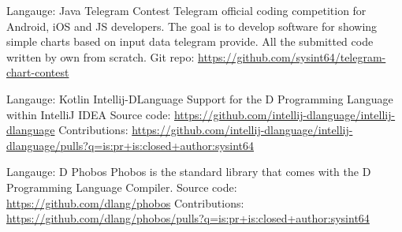 
\cventry
{Langauge: Java}
{Telegram Contest}
{}
{}
{
Telegram official coding competition for Android, iOS and JS developers. \linebreak
The goal is to develop software for showing simple charts based on input data telegram provide.\linebreak
All the submitted code written by own from scratch.\linebreak
Git repo: \url{https://github.com/sysint64/telegram-chart-contest}\linebreak
}

\cventry
{Langauge: Kotlin}
{Intellij-DLanguage}
{}
{}
{
Support for the D Programming Language within IntelliJ IDEA\linebreak
Source code: \url{https://github.com/intellij-dlanguage/intellij-dlanguage}\linebreak
Contributions: \url{https://github.com/intellij-dlanguage/intellij-dlanguage/pulls?q=is:pr+is:closed+author:sysint64}\linebreak
}

\cventry
{Langauge: D}
{Phobos}
{}
{}
{
Phobos is the standard library that comes with the D Programming Language Compiler.\linebreak
Source code: \url{https://github.com/dlang/phobos}\linebreak
Contributions: \url{https://github.com/dlang/phobos/pulls?q=is:pr+is:closed+author:sysint64}
}



